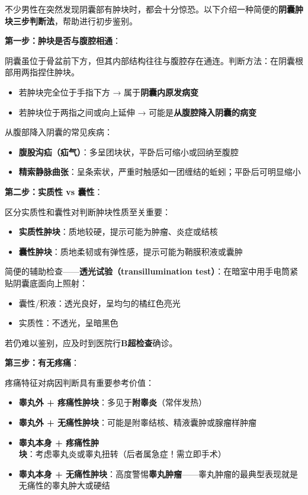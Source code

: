 \documentclass[12pt,a4paper,twoside]{ctexbook}
\begin{document}
不少男性在突然发现阴囊部有肿块时，都会十分惊恐。以下介绍一种简便的\textbf{阴囊肿块三步判断法}，帮助进行初步鉴别。

\vspace{0.5em}
\noindent\textbf{第一步：肿块是否与腹腔相通}：

阴囊虽位于骨盆前下方，但其内部结构往往与腹腔存在通连。判断方法：在阴囊根部用两指捏住肿块。
\begin{itemize}
	\item 若肿块完全位于手指下方 → 属于\textbf{阴囊内原发病变}
	\item 若肿块位于两指之间或向上延伸 → 可能是\textbf{从腹腔降入阴囊的病变}
\end{itemize}

从腹部降入阴囊的常见疾病：
\begin{itemize}
	\item \textbf{腹股沟疝（疝气）}：多呈团块状，平卧后可缩小或回纳至腹腔
	\item \textbf{精索静脉曲张}：呈条索状，严重时触感如一团缠结的蚯蚓；平卧后可明显缩小
\end{itemize}

\vspace{0.5em}
\noindent\textbf{第二步：实质性 vs 囊性}：

区分实质性和囊性对判断肿块性质至关重要：
\begin{itemize}
	\item \textbf{实质性肿块}：质地较硬，提示可能为肿瘤、炎症或结核
	\item \textbf{囊性肿块}：质地柔韧或有弹性感，提示可能为鞘膜积液或囊肿
\end{itemize}

简便的辅助检查——\textbf{透光试验（transillumination test）}：在暗室中用手电筒紧贴阴囊底面向上照射：
\begin{itemize}
	\item 囊性/积液：透光良好，呈均匀的橘红色亮光
	\item 实质性：不透光，呈暗黑色
\end{itemize}

若仍难以鉴别，应及时到医院行\textbf{B超检查}确诊。

\vspace{0.5em}
\noindent\textbf{第三步：有无疼痛}：

疼痛特征对病因判断具有重要参考价值：

\begin{itemize}
	\item \textbf{睾丸外 + 疼痛性肿块}：多见于\textbf{附睾炎}（常伴发热）
	\item \textbf{睾丸外 + 无痛性肿块}：可能是附睾结核、精液囊肿或腺瘤样肿瘤
	\item \textbf{睾丸本身 + 疼痛性肿块}：考虑睾丸炎或睾丸扭转（后者属急症！需立即手术）
	\item \textbf{睾丸本身 + 无痛性肿块}：高度警惕\textbf{睾丸肿瘤}——睾丸肿瘤的最典型表现就是无痛性的睾丸肿大或硬结
\end{itemize}
\end{document}

